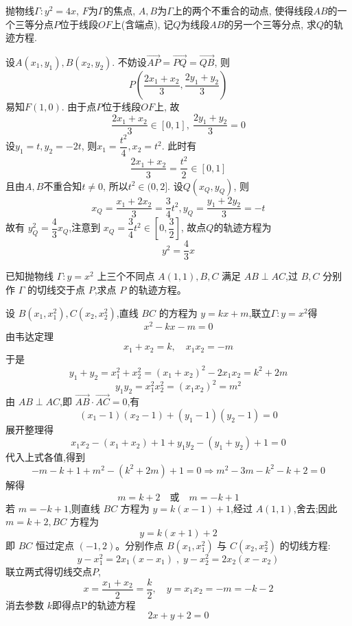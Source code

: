 \begin{questions}
    \question 抛物线$\Gamma: y^2 = 4x$, $F$为$\Gamma$的焦点, $A, B$为$\Gamma$上的两个不重合的动点, 使得线段$AB$的一个三等分点$P$位于线段$OF$上(含端点), 记$Q$为线段$AB$的另一个三等分点, 求$Q$的轨迹方程.
    \begin{solution}
        设$A(x_1, y_1),B(x_2, y_2)$. 不妨设$\overrightarrow{AP} = \overrightarrow{PQ} = \overrightarrow{QB}$, 则
        \[
        P\left(\frac{2x_1+x_2}{3}, \frac{2y_1+y_2}{3}\right)
        \]
        易知$F(1,0)$. 由于点$P$位于线段$OF$上, 故
        \[
        \frac{2x_1+x_2}{3}\in[0,1],\ \frac{2y_1+y_2}{3}=0
        \]
        设$y_1 = t,y_2 = -2t$, 则$x_1 = \dfrac{t^2}{4},x_2 = t^2$. 此时有
        \[
        \frac{2x_1+x_2}{3}=\frac{t^2}{2}\in[0,1]
        \]
        且由$A, B$不重合知$t\neq0$, 所以$t^2\in(0, 2]$.
        设$Q(x_Q, y_Q)$, 则
        \[
        x_Q = \frac{x_1+2x_2}{3} = \frac{3}{4}t^2, y_Q = \frac{y_1+2y_2}{3} = -t
        \]
        故有 $y_Q^2 = \dfrac{4}{3}x_Q$,注意到 $x_Q = \dfrac{3}{4}t^2 \in \left[0, \dfrac{3}{2}\right]$, 故点$Q$的轨迹方程为 
        \[
        y^2 = \frac{4}{3}x
        \]
    \end{solution}

    \question 已知抛物线 $\Gamma:y = x^2$ 上三个不同点 $A(1,1),B,C$ 满足 $AB \perp AC$,过 $B,C$ 分别作 $\Gamma$ 的切线交于点 $P$,求点 $P$ 的轨迹方程。
    \begin{solution}
        设 $B(x_1, x_1^2),C(x_2, x_2^2)$,直线 $BC$ 的方程为 $y = kx + m$,联立$\Gamma:y = x^2$得
        \[
        x^2 - kx - m = 0
        \]
        由韦达定理
        \[
        x_1 + x_2 = k,\quad x_1 x_2 = -m
        \]
        于是
        \[
        y_1 + y_2 = x_1^2 + x_2^2 = (x_1 + x_2)^2 - 2x_1 x_2 = k^2 + 2m
        \]
        \[
        y_1 y_2 = x_1^2 x_2^2 = (x_1 x_2)^2 = m^2
        \]
        由 $AB \perp AC$,即 $\overrightarrow{AB} \cdot \overrightarrow{AC} = 0$,有
        \[
        (x_1 - 1)(x_2 - 1) + (y_1 - 1)(y_2 - 1) = 0
        \]
        展开整理得
        \[
        x_1 x_2 - (x_1 + x_2) + 1 + y_1 y_2 - (y_1 + y_2) + 1 = 0
        \]
        代入上式各值,得到
        \[
        -m - k + 1 + m^2 - (k^2 + 2m) + 1 = 0
        \Rightarrow m^2 - 3m - k^2 - k + 2 = 0
        \]
        解得
        \[
        m = k + 2 \quad \text{或} \quad m = -k + 1
        \]
        若 $m = -k + 1$,则直线 $BC$ 方程为 $y = k(x - 1) + 1$,经过 $A(1,1)$,舍去;因此 $m = k + 2,BC$ 方程为
        \[
        y = k(x + 1) + 2
        \]
        即 $BC$ 恒过定点 $(-1, 2)$。分别作点 $B(x_1, x_1^2)$ 与 $C(x_2, x_2^2)$ 的切线方程:
        \[
        y - x_1^2 = 2x_1(x - x_1)\; ,\; y - x_2^2 = 2x_2(x - x_2) 
        \]
        联立两式得切线交点$P$,
        \[
        x = \frac{x_1 + x_2}{2} = \frac{k}{2}, \quad y = x_1 x_2 = -m = -k-2
        \]
        消去参数 $k$即得点P的轨迹方程
        \[
        2x + y + 2 = 0
        \]
    \end{solution}


\end{questions}

